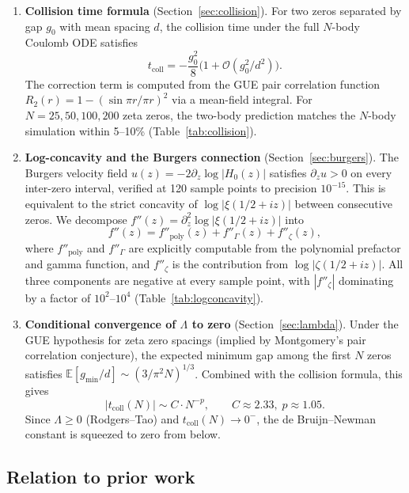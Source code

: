\documentclass[11pt,a4paper]{article}
\begin{document}
\begin{enumerate}
\item \textbf{Collision time formula} (Section~\ref{sec:collision}).
  For two zeros separated by gap $g_0$ with mean spacing $d$, the
  collision time under the full $N$-body Coulomb ODE satisfies
  \[
    t_{\mathrm{coll}} = -\frac{g_0^2}{8}\bigl(1 + \mathcal{O}(g_0^2/d^2)\bigr).
  \]
  The correction term is computed from the GUE pair correlation
  function $R_2(r) = 1 - (\sin\pi r/\pi r)^2$ via a mean-field
  integral. For $N = 25, 50, 100, 200$ zeta zeros, the two-body
  prediction matches the $N$-body simulation within 5--10\%
  (Table~\ref{tab:collision}).

\item \textbf{Log-concavity and the Burgers connection}
  (Section~\ref{sec:burgers}). The Burgers velocity field
  $u(z) = -2\partial_z\log|H_0(z)|$ satisfies $\partial_z u > 0$ on
  every inter-zero interval, verified at 120 sample points to
  precision $10^{-15}$. This is equivalent to the strict concavity of
  $\log|\xi(1/2+iz)|$ between consecutive zeros. We decompose
  $f''(z) = \partial_z^2\log|\xi(1/2+iz)|$ into
  \[
    f''(z) = f''_{\mathrm{poly}}(z) + f''_{\Gamma}(z) + f''_{\zeta}(z),
  \]
  where $f''_{\mathrm{poly}}$ and $f''_{\Gamma}$ are explicitly
  computable from the polynomial prefactor and gamma function, and
  $f''_{\zeta}$ is the contribution from $\log|\zeta(1/2+iz)|$.
  All three components are negative at every sample point, with
  $|f''_{\zeta}|$ dominating by a factor of $10^2$--$10^4$
  (Table~\ref{tab:logconcavity}).

\item \textbf{Conditional convergence of $\Lambda$ to zero}
  (Section~\ref{sec:lambda}). Under the GUE hypothesis for zeta zero
  spacings (implied by Montgomery's pair correlation conjecture), the
  expected minimum gap among the first $N$ zeros satisfies
  $\mathbb{E}[g_{\min}/d] \sim (3/\pi^2 N)^{1/3}$. Combined with
  the collision formula, this gives
  \[
    |t_{\mathrm{coll}}(N)| \sim C \cdot N^{-p}, \qquad
    C \approx 2.33,\; p \approx 1.05.
  \]
  Since $\Lambda \geq 0$ (Rodgers--Tao) and $t_{\mathrm{coll}}(N)
  \to 0^-$, the de Bruijn--Newman constant is squeezed to zero from
  below.
\end{enumerate}

\subsection{Relation to prior work}
\end{document}

